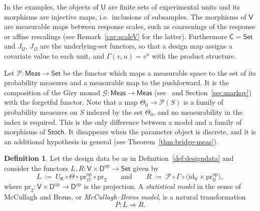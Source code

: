 \documentclass[11pt,a4paper]{article}
\theoremstyle{plain}
\theoremstyle{definition}
\newtheorem{definition}[theorem]{Definition}
\theoremstyle{remark}
\newcommand{\cat}[1]{\mathsf{#1}}
\newcommand{\catU}{\cat{U}}
\newcommand{\catV}{\cat{V}}
\newcommand{\catO}{\cat{\Omega}}
\newcommand{\catD}{\cat{D}}
\newcommand{\catK}{\cat{K}}
\newcommand{\Meas}{\cat{Meas}}
\newcommand{\Set}{\cat{Set}}
\newcommand{\Stoch}{\cat{Stoch}}
\newcommand{\G}{\mathcal{G}}
\newcommand{\Prb}{\mathcal{P}}
\newcommand{\op}{\mathrm{op}}
\newcommand{\id}{\mathrm{id}}
\newcommand{\pr}{\mathrm{pr}}
\begin{document}
In the examples, the objects of $\catU$ are finite sets of experimental units
and its morphisms are injective maps, i.e.\ inclusions of subsamples. The
morphisms of $\catV$ are measurable maps between response scales, such as
coarsenings of the response or affine rescalings (see
Remark~\ref{cav:scaleV} for the latter). Furthermore $\cat{C} = \Set$ and
$J_{\catU}$, $J_{\catO}$ are the underlying-set functors, so that a design map
assigns a covariate value to each unit, and $\Gamma(v,u) = v^{u}$ with the
product structure.

Let $\Prb \colon \Meas \to \Set$ be the functor which maps a measurable space
to the set of its probability measures and a measurable map to the
pushforward. It is the composition of the Giry monad
$\G \colon \Meas \to \Meas$ (see~\cite{giry_categorical_1982} and
Section~\ref{sec:markov}) with the forgetful functor. Note that a map
$\Theta_0 \to \Prb(S)$ is a family of probability measures on $S$ indexed by
the set $\Theta_0$, and no measurability in the index is required. This is the
only difference between a model and a family of morphisms of $\Stoch$. It
disappears when the parameter object is discrete, and it is an additional
hypothesis in general (see Theorem~\ref{thm:bridge-meas}).

\begin{definition}\label{def:mcbmodel}
Let the design data be as in Definition~\ref{def:designdata} and consider the
functors $L, R \colon \catV \times \catD^{\op} \to \Set$ given by
\[
L \;\coloneqq\; U_{\catK} \circ \Theta \circ \pr_{\catO}^{\op} \circ \pr_{2}
\qquad\text{and}\qquad
R \;\coloneqq\; \Prb \circ \Gamma \circ \bigl(\id_{\catV} \times \pr_{\catU}^{\op}\bigr),
\]
where $\pr_2 \colon \catV \times \catD^{\op} \to \catD^{\op}$ is the
projection. A \emph{statistical model} in the sense of McCullagh and Br\o ns,
or \emph{McCullagh--Br\o ns model}, is a natural transformation
\[
P \colon L \Longrightarrow R.
\]
\end{definition}
\end{document}
